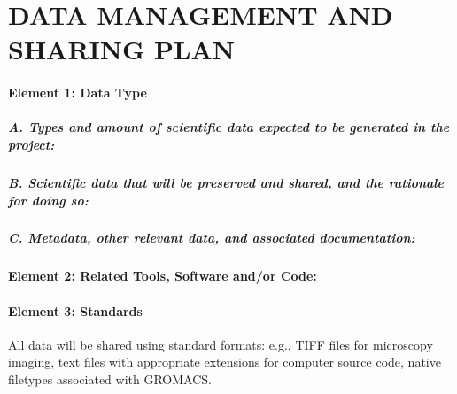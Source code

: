 \documentclass[../main.tex]{subfiles}
\begin{document}

\part{DATA MANAGEMENT AND SHARING PLAN}

\subsection*{Element 1: Data Type}
\subsubsection*{A. Types and amount of scientific data expected to be generated in the project:}
\lipsum[1-3]

\subsubsection*{B. Scientific data that will be preserved and shared, and the rationale for doing so:}
\lipsum[1-3]

\subsubsection*{C. Metadata, other relevant data, and associated documentation:}
\lipsum[1-3]

\subsection*{Element 2: Related Tools, Software and/or Code:}
\lipsum[1-3]

\subsection*{Element 3: Standards}
All data will be shared using standard formats: e.g., TIFF files for microscopy imaging, text files with appropriate extensions for computer source code, native filetypes associated with GROMACS.
\end{document}
